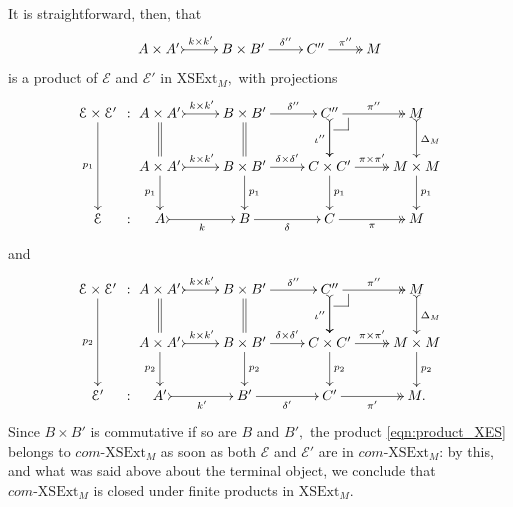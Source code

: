 \documentclass[a4paper]{amsart}
\makeatletter
\theoremstyle{plain}
\theoremstyle{definition}
\theoremstyle{remark}
\newcommand{\pullback}[4]{{#1 \leftindex_{#2}{\times}_{#3} #4}}
\def\pullback{%
 \ar@{-}[]+R+<4pt,-3pt>;[]+RD+<4pt,-6pt>%
 \ar@{-}[]+D+<3pt,-6pt>;[]+RD+<4pt,-6pt>}
\makeatother
\begin{document}
It is straightforward, then, that
\begin{equation}
\label{eqn:product_XES}
\xymatrix{
{A\times A'} \ar@{>->}[r]^-{k\times k'} &{B\times B'} \ar[r]^-{\delta''} &{C''} \ar@{->>}[r]^-{\pi''} &{M}
}
\end{equation}
is a product of $\mathcal{E}$ and $\mathcal{E}'$ in $\mathrm{XSExt}_M,$ with projections
\begin{equation*}
\begin{aligned}
{\xymatrixcolsep{0.1pc}
\xymatrixrowsep{2.35pc}
\xymatrix{
{\mathcal{E}\times\mathcal{E}'} \ar[dd]_-{p_1} &{:}\\
{} \\
{\mathcal{E}} &{:}
}}
{\xymatrix{
{A\times A'} \ar@{=}[d] \ar@{>->}[r]^-{k\times k'} &{B\times B'} \ar[r]^-{\delta''} \ar@{=}[d] &{C''} \ar@{->>}[r]^-{\pi''} \ar[d]\pullback \ar@{>->}[d]_-{\iota''} &{M} \ar@{>->}[d]^-{\Delta_M} \\
 {A\times A'} \ar[d]_-{p_1} \ar@{>->}[r]^-{k\times k'} &{B\times B'} \ar[d]^-{p_1} \ar[r]^-{\delta\times\delta'} &{C\times C'} \ar[d]^-{p_1} \ar@{->>}[r]^-{\pi\times \pi'} &{M\times M} \ar[d]^-{p_1} \\
 {A} \ar@{>->}[r]_-{k} &{B} \ar[r]_-{\delta} &{C} \ar@{->>}[r]_-{\pi} &{M}
}}
\end{aligned}
\end{equation*}
and
\begin{equation*}
\begin{aligned}
{\xymatrixcolsep{0.1pc}
\xymatrixrowsep{2.35pc}
\xymatrix{
{\mathcal{E}\times\mathcal{E}'} \ar[dd]_-{p_2} &{:}\\
{} \\
{\mathcal{E}'} &{:}
}}
{\xymatrix{
{A\times A'} \ar@{=}[d] \ar@{>->}[r]^-{k\times k'} &{B\times B'} \ar[r]^-{\delta''} \ar@{=}[d] &{C''} \ar@{->>}[r]^-{\pi''} \ar[d]\pullback \ar@{>->}[d]_-{\iota''} &{M} \ar@{>->}[d]^-{\Delta_M} \\
 {A\times A'} \ar[d]_-{p_2} \ar@{>->}[r]^-{k\times k'} &{B\times B'} \ar[d]^-{p_2} \ar[r]^-{\delta\times\delta'} &{C\times C'} \ar[d]^-{p_2} \ar@{->>}[r]^-{\pi\times \pi'} &{M\times M} \ar[d]^-{p_2} \\
 {A'} \ar@{>->}[r]_-{k'} &{B'} \ar[r]_-{\delta'} &{C'} \ar@{->>}[r]_-{\pi'} &{M.}
}}
\end{aligned}
\end{equation*}
Since $B\times B'$ is commutative if so are $B$ and $B',$ the product \eqref{eqn:product_XES} belongs to $com\text{-}\mathrm{XSExt}_M$ as soon as both $\mathcal{E}$ and $\mathcal{E}'$ are in $com\text{-}\mathrm{XSExt}_M$: by this, and what was said above about the terminal object, we conclude that $com\text{-}\mathrm{XSExt}_M$ is closed under finite products in $\mathrm{XSExt}_M.$
\end{document}
